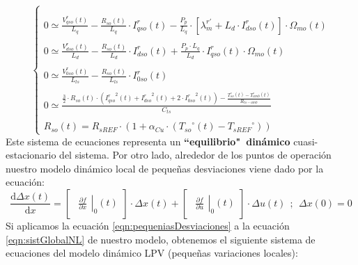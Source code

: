 \documentclass[10pt]{article}
\begin{document}
\begin{enumerate}
\begin{equation}
\begin{cases}
			\\
			\\
			0\simeq \frac{V_{qso}^{r}(t)}{L_{q}}-\frac{R_{so}(t)}{L_{q}}\cdot I_{qso}^{r}(t)-\frac{P_{p}}{L_{q}}\cdot [ \lambda_{m}^{r'}+L_{d}\cdot I_{dso}^{r}(t) ]\cdot \Omega_{mo}(t)
			\\
			\\
			0 \simeq \frac{V_{dso}^{r}(t)}{L_{d}}-\frac{R_{so}\left ( t \right )}{L_{d}}\cdot I_{dso}^{r}(t)+\frac{P_{p}\cdot L_{q}}{L_{d}}\cdot I_{qso}^{r}(t)\cdot \Omega_{mo}(t)
			\\
			\\
			0 \simeq \frac{V_{0so}^{r}(t)}{L_{ls}}-\frac{R_{so}\left ( t \right )}{L_{ls}}\cdot I_{0so}^{r}(t)
			\\
			\\
			0 \simeq \frac{\frac{3}{2}\cdot R_{so}(t)\cdot \left ( {I_{qso}^{r}}^{2}(t)+{I_{dso}^{r}}^{2}(t)+2\cdot {I_{0so}^{r}}^{2}(t) \right )-\frac{T_{so}^{\circ}\left ( t \right )-T_{amb}^{\circ}\left ( t \right )}{R_{ts-amb}}}{C_{ts}}
			\\
			\\
			R_{so}(t)=R_{sREF}\cdot \left ( 1+\alpha_{Cu}\cdot \left ( {T_{so}}^{\circ}\left ( t \right )-{T_{sREF}}^{\circ} \right ) \right )
		\end{cases}
	\end{equation}
	Este sistema de ecuaciones representa un \textbf{``equilibrio"\  dinámico} cuasi-estacionario del sistema. Por otro lado, alrededor de los puntos de operación nuestro modelo dinámico local de pequeñas desviaciones viene dado por la ecuación:
	\begin{equation}
		\label{eqn:pequeniasDesviaciones}
		\frac{\mathrm{d} \Delta x(t)}{\mathrm{d} x}=
		\begin{bmatrix}
			\left.\begin{matrix}
				\frac{\partial f}{\partial x}
			\end{matrix}\right|_{0}(t)
		\end{bmatrix}\cdot\Delta x(t)+
		\begin{bmatrix}
			\left.\begin{matrix}
				\frac{\partial f}{\partial u}
			\end{matrix}\right|_{0}(t)
		\end{bmatrix}\cdot\Delta u(t)
		\ \ ;\ \ \Delta x(0)=0
	\end{equation}
	Si aplicamos la ecuación \ref{eqn:pequeniasDesviaciones} a la ecuación \ref{eqn:sistGlobalNL} de nuestro modelo, obtenemos el siguiente sistema de ecuaciones del modelo dinámico LPV (pequeñas variaciones locales):

\end{enumerate}
\end{document}

